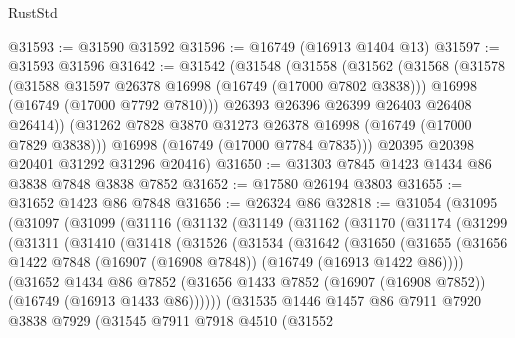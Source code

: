 \begin{lexlean}{RustStd}
\begin{coremodule}
@31593 := @31590 @31592
@31596 := @16749 (@16913 @1404 @13)
@31597 := @31593 @31596
@31642 := @31542
    (@31548
      (@31558
        (@31562
          (@31568
            (@31578
              (@31588 @31597 @26378 @16998 (@16749 (@17000 @7802 @3838)))
              @16998
              (@16749 (@17000 @7792 @7810)))
            @26393
            @26396
            @26399
            @26403
            @26408
            @26414))
        (@31262 @7828 @3870 @31273 @26378 @16998 (@16749 (@17000 @7829 @3838)))
        @16998
        (@16749 (@17000 @7784 @7835)))
      @20395
      @20398
      @20401
      @31292
      @31296
      @20416)
@31650 := @31303 @7845 @1423 @1434 @86 @3838 @7848 @3838 @7852
@31652 := @17580 @26194 @3803
@31655 := @31652 @1423 @86 @7848
@31656 := @26324 @86
@32818 := @31054
    (@31095
      (@31097
        (@31099
          (@31116
            (@31132
              (@31149
                (@31162
                  (@31170
                    (@31174
                      (@31299
                        (@31311
                          (@31410
                            (@31418
                              (@31526
                                (@31534
                                  (@31642
                                    (@31650
                                      (@31655
                                        (@31656
                                          @1422
                                          @7848
                                          (@16907 (@16908 @7848))
                                          (@16749 (@16913 @1422 @86))))
                                      (@31652
                                        @1434
                                        @86
                                        @7852
                                        (@31656
                                          @1433
                                          @7852
                                          (@16907 (@16908 @7852))
                                          (@16749 (@16913 @1433 @86))))))
                                  (@31535
                                    @1446
                                    @1457
                                    @86
                                    @7911
                                    @7920
                                    @3838
                                    @7929
                                    (@31545
                                      @7911
                                      @7918
                                      @4510
                                      (@31552

\end{coremodule}
\end{lexlean}
